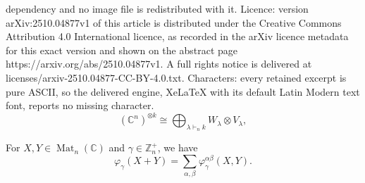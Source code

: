 \documentclass[10pt,a4paper]{amsart}
\DeclareMathOperator{\Mat}{Mat}
\newcommand{\ot}{\otimes} %
\newcommand{\undomweightsp}[1]{\mathbb Z^{+}_{#1}}
\newcommand{\vp}{\varphi} %
\newcommand{\ya}{\alpha}
\newcommand{\yb}{\beta}
\newcommand{\yc}{\gamma}
\newcommand{\yx}{\lambda}
\begin{document}
dependency and no image file is redistributed with it. Licence: version arXiv:2510.04877v1 of this article is distributed under the Creative Commons Attribution 4.0 International licence, as recorded in the arXiv licence metadata for this exact version and shown on the abstract page https://arxiv.org/abs/2510.04877v1. A full rights notice is delivered at licenses/arxiv-2510.04877-CC-BY-4.0.txt. Characters: every retained excerpt is pure ASCII, so the delivered engine, XeLaTeX with its default Latin Modern text font, reports no missing character.
\begin{equation}
    \label{eq:schur-weyl}
    (\mathbb{C}^n)^{\ot k} \cong \bigoplus_{\yx \vdash_{n} k} W_\yx \ot V_\yx,
\end{equation}

\begin{thm}
    \label{thm:the_binomial_theorem}
    For $X,Y \in \Mat_n(\mathbb{C})$ and $\yc \in \undomweightsp{n}$, we have
    \begin{equation}
        \label{eq:varphi_sum_sum}
        \vp_\yc(X+Y)=\sum_{\ya, \yb} \vp^{\ya \yb}_\yc(X, Y).
    \end{equation}
\end{thm}
\end{document}
